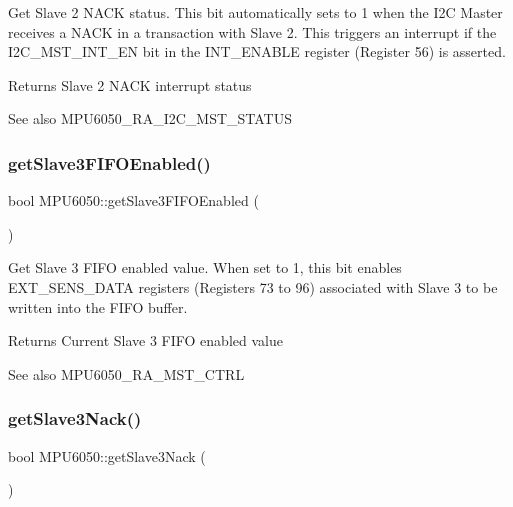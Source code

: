 Get Slave 2 N\+A\+CK status. This bit automatically sets to 1 when the I2C Master receives a N\+A\+CK in a transaction with Slave 2. This triggers an interrupt if the I2\+C\+\_\+\+M\+S\+T\+\_\+\+I\+N\+T\+\_\+\+EN bit in the I\+N\+T\+\_\+\+E\+N\+A\+B\+LE register (Register 56) is asserted. \begin{DoxyReturn}{Returns}
Slave 2 N\+A\+CK interrupt status 
\end{DoxyReturn}
\begin{DoxySeeAlso}{See also}
M\+P\+U6050\+\_\+\+R\+A\+\_\+\+I2\+C\+\_\+\+M\+S\+T\+\_\+\+S\+T\+A\+T\+US 
\end{DoxySeeAlso}
\mbox{\label{class_m_p_u6050_a9d75ec63e2320ecfb84a2b082397f900}} 
\subsubsection{\texorpdfstring{getSlave3FIFOEnabled()}{getSlave3FIFOEnabled()}}
{\footnotesize\ttfamily bool M\+P\+U6050\+::get\+Slave3\+F\+I\+F\+O\+Enabled (\begin{DoxyParamCaption}{ }\end{DoxyParamCaption})}

Get Slave 3 F\+I\+FO enabled value. When set to 1, this bit enables E\+X\+T\+\_\+\+S\+E\+N\+S\+\_\+\+D\+A\+TA registers (Registers 73 to 96) associated with Slave 3 to be written into the F\+I\+FO buffer. \begin{DoxyReturn}{Returns}
Current Slave 3 F\+I\+FO enabled value 
\end{DoxyReturn}
\begin{DoxySeeAlso}{See also}
M\+P\+U6050\+\_\+\+R\+A\+\_\+\+M\+S\+T\+\_\+\+C\+T\+RL 
\end{DoxySeeAlso}
\mbox{\label{class_m_p_u6050_a55f24d2f2b13d6e28a7c8b6bf2913520}} 
\subsubsection{\texorpdfstring{getSlave3Nack()}{getSlave3Nack()}}
{\footnotesize\ttfamily bool M\+P\+U6050\+::get\+Slave3\+Nack (\begin{DoxyParamCaption}{ }\end{DoxyParamCaption})}


